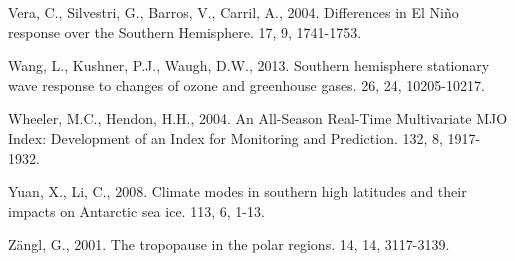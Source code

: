 \documentclass[spanish,a4paper,12pt,oneside]{book}
\begin{document}
\hypertarget{ref-Vera2004}{}
Vera, C., Silvestri, G., Barros, V., Carril, A., 2004. Differences in El
Niño response over the Southern Hemisphere. 17, 9, 1741-1753.

\hypertarget{ref-Wang2013}{}
Wang, L., Kushner, P.J., Waugh, D.W., 2013. Southern hemisphere
stationary wave response to changes of ozone and greenhouse gases. 26,
24, 10205-10217.

\hypertarget{ref-Wheeler2004}{}
Wheeler, M.C., Hendon, H.H., 2004. An All-Season Real-Time Multivariate
MJO Index: Development of an Index for Monitoring and Prediction. 132,
8, 1917-1932.

\hypertarget{ref-Yuan2008}{}
Yuan, X., Li, C., 2008. Climate modes in southern high latitudes and
their impacts on Antarctic sea ice. 113, 6, 1-13.

\hypertarget{ref-Zangl2001}{}
Zängl, G., 2001. The tropopause in the polar regions. 14, 14, 3117-3139.
\end{document}
